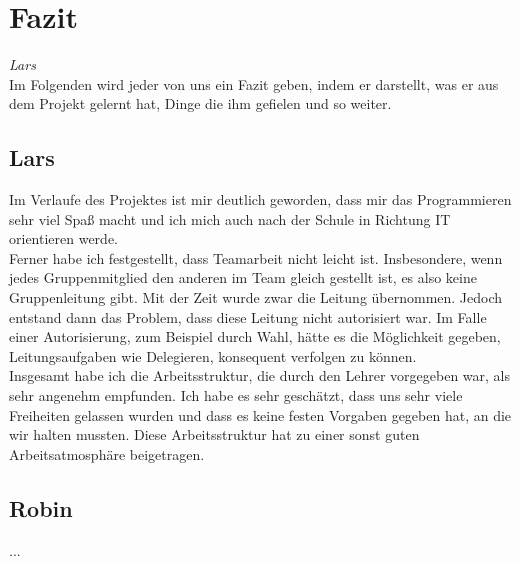 \documentclass[12pt,a4paper,bibliography=totocnumbered,listof=totocnumbered]{scrartcl}
\begin{document}
\section{Fazit}
\label{sec:Fazit}
\emph{Lars}\\
Im Folgenden wird jeder von uns ein Fazit geben, indem er darstellt, was er aus dem Projekt gelernt hat, Dinge die ihm gefielen und so weiter.

\subsection{Lars}
Im Verlaufe des Projektes ist mir deutlich geworden, dass mir das Programmieren sehr viel Spaß macht und ich mich auch nach der Schule in Richtung IT orientieren werde. \\
Ferner habe ich festgestellt, dass Teamarbeit nicht leicht ist. Insbesondere, wenn jedes Gruppenmitglied den anderen im Team gleich gestellt ist, es also keine Gruppenleitung gibt. Mit der Zeit wurde zwar die Leitung übernommen. Jedoch entstand dann das Problem, dass diese Leitung nicht autorisiert war. Im Falle einer Autorisierung, zum Beispiel durch Wahl, hätte es die Möglichkeit gegeben, Leitungsaufgaben wie Delegieren, konsequent verfolgen zu können. \\
Insgesamt habe ich die Arbeitsstruktur, die durch den Lehrer vorgegeben war, als sehr angenehm empfunden. Ich habe es sehr geschätzt, dass uns sehr viele Freiheiten gelassen wurden und dass es keine festen Vorgaben gegeben hat, an die wir halten mussten. Diese Arbeitsstruktur hat zu einer sonst guten Arbeitsatmosphäre beigetragen.

\subsection{Robin}
...
\end{document}
